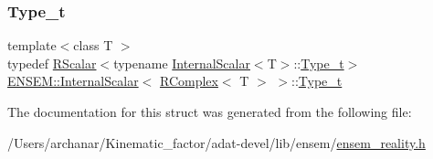 \subsubsection{\texorpdfstring{Type\_t}{Type\_t}\hspace{0.1cm}{\footnotesize\ttfamily [3/3]}}
{\footnotesize\ttfamily template$<$class T $>$ \\
typedef \mbox{\hyperlink{classENSEM_1_1RScalar}{R\+Scalar}}$<$typename \mbox{\hyperlink{structENSEM_1_1InternalScalar}{Internal\+Scalar}}$<$T$>$\+::\mbox{\hyperlink{structENSEM_1_1InternalScalar_3_01RComplex_3_01T_01_4_01_4_ae83e499664d5d34d7a1271f9151f4ab0}{Type\+\_\+t}}$>$ \mbox{\hyperlink{structENSEM_1_1InternalScalar}{E\+N\+S\+E\+M\+::\+Internal\+Scalar}}$<$ \mbox{\hyperlink{classENSEM_1_1RComplex}{R\+Complex}}$<$ T $>$ $>$\+::\mbox{\hyperlink{structENSEM_1_1InternalScalar_3_01RComplex_3_01T_01_4_01_4_ae83e499664d5d34d7a1271f9151f4ab0}{Type\+\_\+t}}}



The documentation for this struct was generated from the following file\+:\begin{DoxyCompactItemize}
\item 
/\+Users/archanar/\+Kinematic\+\_\+factor/adat-\/devel/lib/ensem/\mbox{\hyperlink{adat-devel_2lib_2ensem_2ensem__reality_8h}{ensem\+\_\+reality.\+h}}\end{DoxyCompactItemize}
